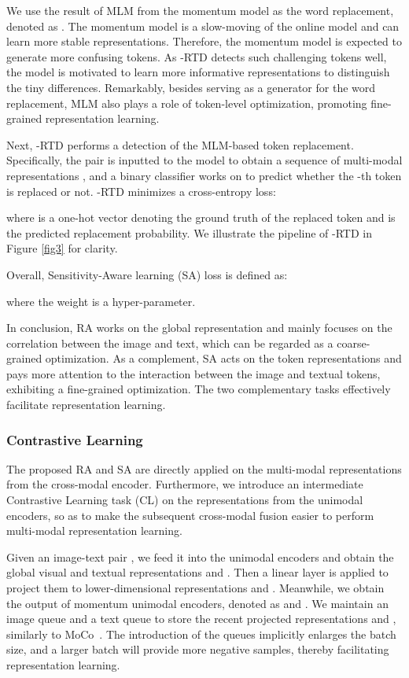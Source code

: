 \documentclass{article}
\begin{document}
We use the result of MLM from the momentum model as the word replacement, denoted as .
The momentum model is a slow-moving of the online model and can learn more stable representations. Therefore, the momentum model is expected to generate more confusing tokens.
As -RTD detects such challenging tokens well, the model is motivated to learn more informative representations to distinguish the tiny differences.
Remarkably, besides serving as a generator for the word replacement, MLM also plays a role of token-level optimization, promoting fine-grained representation learning.

Next, -RTD performs a detection of the MLM-based token replacement. Specifically, the pair  is inputted to the model to obtain a sequence of multi-modal representations , and a binary classifier works on  to predict whether the -th token is replaced or not.
-RTD minimizes a cross-entropy loss:

where  is a one-hot vector denoting the ground truth of the replaced token and  is the predicted replacement probability.
We illustrate the pipeline of -RTD in Figure \ref{fig3} for clarity.

Overall, Sensitivity-Aware learning (SA) loss is defined as:

where the weight  is a hyper-parameter.

In conclusion, RA works on the global representation  and mainly focuses on the correlation between the image and text, which can be regarded as a coarse-grained optimization.
As a complement, SA acts on the token representations  and pays more attention to the interaction between the image and textual tokens, exhibiting a fine-grained optimization.
The two complementary tasks effectively facilitate representation learning.


\subsubsection{Contrastive Learning}
The proposed RA and SA are directly applied on the multi-modal representations from the cross-modal encoder.
Furthermore, we introduce an intermediate Contrastive Learning task (CL) on the representations from the unimodal encoders, so as to make the subsequent cross-modal fusion easier to perform multi-modal representation learning.

Given an image-text pair , we feed it into the unimodal encoders and obtain the global visual and textual representations  and .
Then a linear layer is applied to project them to lower-dimensional representations  and .
Meanwhile, we obtain the output of momentum unimodal encoders, denoted as  and .
We maintain an image queue  and a text queue  to store the recent  projected representations  and , similarly to MoCo~\cite{he2020momentum}. 
The introduction of the queues implicitly enlarges the batch size, and a larger batch will provide more negative samples, thereby facilitating representation learning.
\end{document}
